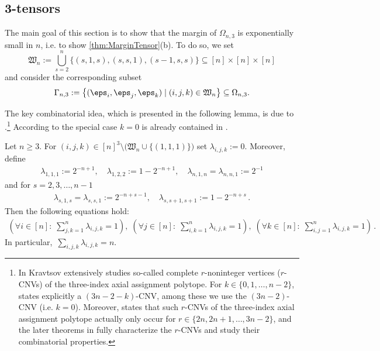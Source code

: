 \subsection{3-tensors}\label{sec:3tensors}

The main goal of this section is to show that the margin of $\Omega_{n,3}$ is exponentially small in $n$, i.e. to show \cref{thm:MarginTensor}(b). To do so, we set
\begin{equation}
\mathfrak{W}_n := \bigcup_{s=2}^n \lbrace (s,1,s), (s,s,1), (s-1,s,s) \rbrace \subseteq [n] \times [n] \times [n]
\end{equation}
and consider the corresponding subset
\begin{equation}
\Gamma_{n,3} := \big\lbrace (\eps_i,\eps_j,\eps_k) \mid (i,j,k) \in \mathfrak{W}_n \big \rbrace \subseteq \Omega_{n,3}.
\end{equation}

The key combinatorial idea, which is presented in the following lemma, is due to \cite[Theorem~1 with $k=0$]{krav}.\footnote{In \cite{krav} Kravtsov extensively studies so-called complete $r$-noninteger vertices ($r$-CNVs) of the three-index axial assignment polytope. For $k \in \{0,1,\ldots,n-2\}$, \cite[Theorem~1]{krav} states explicitly a $(3n-2-k)$-CNV, among these we use the $(3n-2)$-CNV (i.e. $k=0$). Moreover, \cite[Theorem~2]{krav} states that such $r$-CNVs of the three-index axial assignment polytope actually only occur for $r \in \{2n,2n+1, \ldots, 3n-2\}$, and the later theorems in \cite{krav} fully characterize the $r$-CNVs and study their combinatorial properties.}  According to \cite{krav} the special case $k=0$ is already contained in \cite[Theorem~9]{luk}.

\begin{lem}\label{lem:Kravtsov}
Let $n \geq 3$. For $(i,j,k) \in [n]^3 \setminus \big(\mathfrak{W}_n \cup \lbrace (1,1,1) \rbrace \big)$ set $\lambda_{i,j,k} := 0$. Moreover, define
\begin{align*}
\lambda_{1,1,1} := 2^{-n+1}, \quad \lambda_{1,2,2} := 1- 2^{-n+1}, \quad \lambda_{n,1,n} = \lambda_{n,n,1} := 2^{-1}
\end{align*}
and for $s=2,3,\ldots,n-1$
\begin{align*}
\lambda_{s,1,s} = \lambda_{s,s,1} := 2^{-n+s-1} ,\quad \lambda_{s,s+1,s+1} := 1-2^{-n+s} \, .
\end{align*}
Then the following equations hold:
\begin{align}
\left( \forall i \in [n]: \; \sum_{j,k = 1}^n \lambda_{i,j,k} = 1 \right), \;
\left( \forall j \in [n]: \; \sum_{i,k = 1}^n \lambda_{i,j,k} = 1 \right), \;
\left( \forall k \in [n]: \; \sum_{i,j = 1}^n \lambda_{i,j,k} = 1 \right) \, .\label{eq:marginals-krav}
\end{align}
In particular, $\,\sum_{i,j,k} \lambda_{i,j,k} = n$.
\end{lem}


